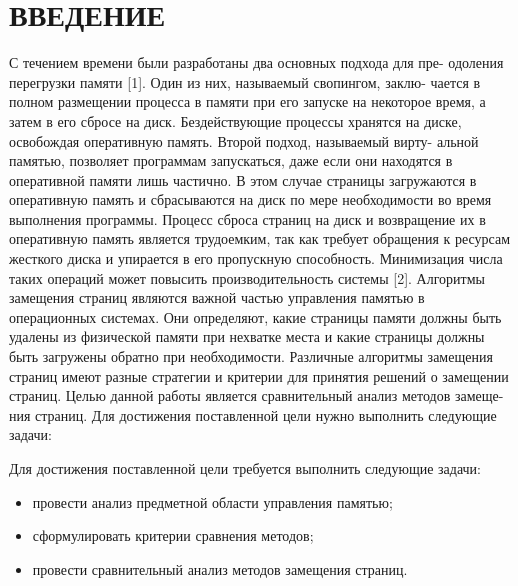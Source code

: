 \chapter*{ВВЕДЕНИЕ}

С течением времени были разработаны два основных подхода для пре-
одоления перегрузки памяти [1]. Один из них, называемый свопингом, заклю-
чается в полном размещении процесса в памяти при его запуске на некоторое
время, а затем в его сбросе на диск. Бездействующие процессы хранятся на
диске, освобождая оперативную память. Второй подход, называемый вирту-
альной памятью, позволяет программам запускаться, даже если они находятся
в оперативной памяти лишь частично. В этом случае страницы загружаются
в оперативную память и сбрасываются на диск по мере необходимости во
время выполнения программы.
Процесс сброса страниц на диск и возвращение их в оперативную память
является трудоемким, так как требует обращения к ресурсам жесткого диска и
упирается в его пропускную способность. Минимизация числа таких операций
может повысить производительность системы [2].
Алгоритмы замещения страниц являются важной частью управления
памятью в операционных системах. Они определяют, какие страницы памяти
должны быть удалены из физической памяти при нехватке места и какие
страницы должны быть загружены обратно при необходимости. Различные
алгоритмы замещения страниц имеют разные стратегии и критерии для
принятия решений о замещении страниц.
Целью данной работы является сравнительный анализ методов замеще-
ния страниц. Для достижения поставленной цели нужно выполнить следующие
задачи:

Для достижения поставленной цели требуется выполнить следующие задачи:
\begin{itemize}
	\item провести анализ предметной области управления памятью;
	\item сформулировать критерии сравнения методов;
	\item провести сравнительный анализ методов замещения страниц.
\end{itemize}